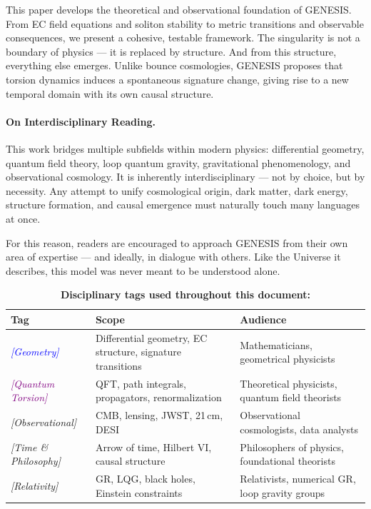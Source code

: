 \documentclass{article}
\begin{document}
\vspace{1ex}

This paper develops the theoretical and observational foundation of GENESIS. From EC field equations and soliton stability to metric transitions and observable consequences, we present a cohesive, testable framework. The singularity is not a boundary of physics — it is replaced by structure. And from this structure, everything else emerges. 
Unlike bounce cosmologies, GENESIS proposes that torsion dynamics induces a spontaneous signature change, giving rise to a new temporal domain with its own causal structure.


\paragraph{On Interdisciplinary Reading.}
This work bridges multiple subfields within modern physics: differential geometry, quantum field theory, loop quantum gravity, gravitational phenomenology, and observational cosmology.  
It is inherently interdisciplinary — not by choice, but by necessity.  
Any attempt to unify cosmological origin, dark matter, dark energy, structure formation, and causal emergence must naturally touch many languages at once.

For this reason, readers are encouraged to approach GENESIS from their own area of expertise — and ideally, in dialogue with others.  
Like the Universe it describes, this model was never meant to be understood alone.

\begin{table}[h!]
\centering
\renewcommand{\arraystretch}{1.3}
\caption*{\textbf{Disciplinary tags used throughout this document:}}
\begin{tabular}{|p{3.3cm}|p{5.5cm}|p{5.5cm}|}
\hline
\textbf{Tag} & \textbf{Scope} & \textbf{Audience} \\
\hline
\textcolor{blue}{\textit{[Geometry]}} & Differential geometry, EC structure, signature transitions & Mathematicians, geometrical physicists \\
\textcolor{purple}{\textit{[Quantum Torsion]}} & QFT, path integrals, propagators, renormalization & Theoretical physicists, quantum field theorists \\
\textcolor{green!60!black}{\textit{[Observational]}} & CMB, lensing, JWST, 21 cm, DESI & Observational cosmologists, data analysts \\
\textcolor{orange!80!black}{\textit{[Time \& Philosophy]}} & Arrow of time, Hilbert VI, causal structure & Philosophers of physics, foundational theorists \\
\textcolor{blue!40!black}{\textit{[Relativity]}} & GR, LQG, black holes, Einstein constraints & Relativists, numerical GR, loop gravity groups \\
\hline
\end{tabular}
\end{table}
\end{document}
